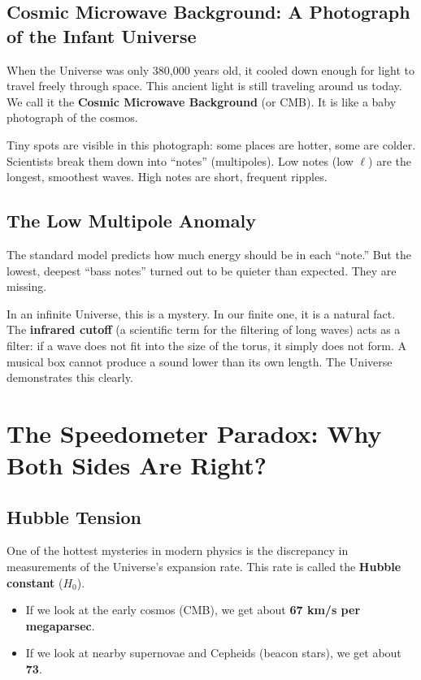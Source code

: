 \documentclass[12pt,a4paper,oneside]{book}
\begin{document}
\section{Cosmic Microwave Background: A Photograph of the Infant Universe}

When the Universe was only 380,000 years old, it cooled down enough for light to travel freely through space. This ancient light is still traveling around us today. We call it the \textbf{Cosmic Microwave Background} (or CMB). It is like a baby photograph of the cosmos.

Tiny spots are visible in this photograph: some places are hotter, some are colder. Scientists break them down into “notes” (multipoles). Low notes (low $\ell$) are the longest, smoothest waves. High notes are short, frequent ripples.

\section{The Low Multipole Anomaly}

The standard model predicts how much energy should be in each “note.” But the lowest, deepest “bass notes” turned out to be quieter than expected. They are missing.

In an infinite Universe, this is a mystery. In our finite one, it is a natural fact. The \textbf{infrared cutoff} (a scientific term for the filtering of long waves) acts as a filter: if a wave does not fit into the size of the torus, it simply does not form. A musical box cannot produce a sound lower than its own length. The Universe demonstrates this clearly.

\chapter{The Speedometer Paradox: Why Both Sides Are Right?}

\section{Hubble Tension}

One of the hottest mysteries in modern physics is the discrepancy in measurements of the Universe's expansion rate. This rate is called the \textbf{Hubble constant} ($H_0$).

\begin{itemize}
    \item If we look at the early cosmos (CMB), we get about \textbf{67 km/s per megaparsec}.
    \item If we look at nearby supernovae and Cepheids (beacon stars), we get about \textbf{73}.
\end{itemize}
\end{document}
